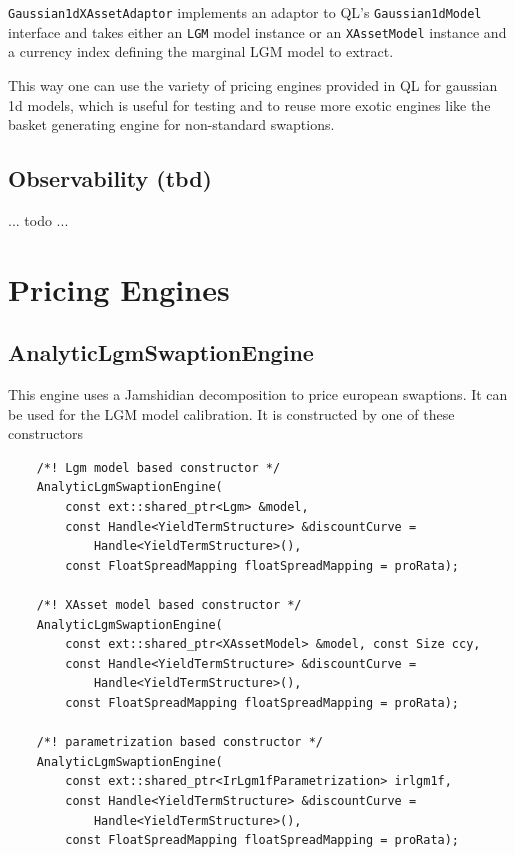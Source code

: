 \documentclass[12pt, a4paper]{article}
\begin{document}
\verb+Gaussian1dXAssetAdaptor+ implements an adaptor to QL's \verb+Gaussian1dModel+ interface and takes either an \verb+LGM+ model instance or an \verb+XAssetModel+ instance and a currency index defining the marginal LGM model to extract.

This way one can use the variety of pricing engines provided in QL for gaussian 1d models, which is useful for testing and to reuse more exotic engines like the basket generating engine for non-standard swaptions.

\subsection{Observability (tbd)}

... todo ...

\section{Pricing Engines}

\subsection{AnalyticLgmSwaptionEngine}

This engine uses a Jamshidian decomposition to price european swaptions. It can be used for the LGM model calibration. It is constructed by one of these constructors

\medskip
\scriptsize
\begin{verbatim}
    /*! Lgm model based constructor */
    AnalyticLgmSwaptionEngine(
        const ext::shared_ptr<Lgm> &model,
        const Handle<YieldTermStructure> &discountCurve =
            Handle<YieldTermStructure>(),
        const FloatSpreadMapping floatSpreadMapping = proRata);

    /*! XAsset model based constructor */
    AnalyticLgmSwaptionEngine(
        const ext::shared_ptr<XAssetModel> &model, const Size ccy,
        const Handle<YieldTermStructure> &discountCurve =
            Handle<YieldTermStructure>(),
        const FloatSpreadMapping floatSpreadMapping = proRata);

    /*! parametrization based constructor */
    AnalyticLgmSwaptionEngine(
        const ext::shared_ptr<IrLgm1fParametrization> irlgm1f,
        const Handle<YieldTermStructure> &discountCurve =
            Handle<YieldTermStructure>(),
        const FloatSpreadMapping floatSpreadMapping = proRata);
\end{verbatim}
\normalsize
\medskip
\end{document}
